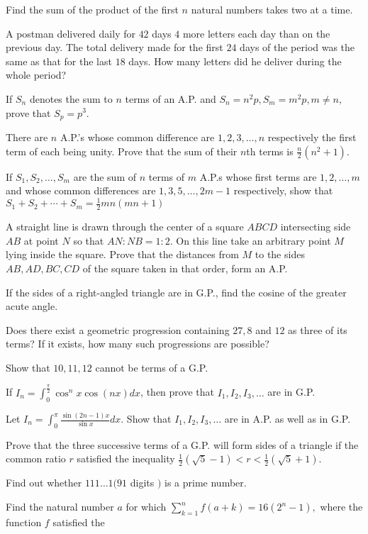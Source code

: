 \item Find the sum of the  product of the first $n$ natural numbers takes two at a time.
\item A postman delivered daily for $42$ days $4$ more letters each day than on the previous day. The total delivery made
  for the first $24$ days of the period was the same as that for the last $18$ days. How many letters did he deliver during the
  whole period?
\item If $S_n$ denotes the sum to $n$ terms of an A.P. and $S_n = n^2p, S_m = m^2p, m\neq n,$ prove that $S_p = p^3$.
\item There are $n$ A.P.'s whose common difference are $1, 2, 3, \ldots, n$ respectively the first term of each being
  unity. Prove that the sum of their $n$th terms is $\frac{n}{2}(n^2 + 1)$.
\item If $S_1, S_2, \ldots, S_m$ are the sum of $n$ terms of $m$ A.P.s whose first terms are $1, 2, \ldots, m$ and whose
  common differences are $1, 3, 5, \ldots, 2m - 1$ respectively, show that $S_1 + S_2 + \cdots + S_m = \frac{1}{2}mn(mn + 1)$
\item A straight line is drawn through the center of a square $ABCD$ intersecting side $AB$ at point $N$ so that $AN:NB =
  1:2.$ On this line take an arbitrary point $M$ lying inside the square. Prove that the distances from $M$ to the sides $AB, AD,
  BC, CD$ of the square taken in that order, form an A.P.
\item If the sides of a right-angled triangle are in G.P., find the cosine of the greater acute angle.
\item Does there exist a geometric progression containing $27, 8$ and $12$ as three of its terms? If it exists, how many
  such progressions are possible?
\item Show that $10, 11, 12$ cannot be terms of a G.P.
\item If $I_n = \displaystyle\int_0^{\frac{\pi}{2}}\cos^nx\cos(nx)dx$, then prove that $I_1, I_2, I_3, \ldots$ are in G.P.
\item Let $\displaystyle I_n = \int_0^\pi \frac{\sin(2n - 1)x}{\sin x}dx.$ Show that $I_1, I_2, I_3, \ldots$ are in A.P. as well as in
  G.P.
\item Prove that the three successive terms of a G.P. will form sides of a triangle if the common ratio $r$ satisfied the
  inequality $\frac{1}{2}(\sqrt{5} - 1) < r < \frac{1}{2}(\sqrt{5} + 1)$.
\item Find out whether $111\ldots1( 91$ digits $)$ is a prime number.
\item Find the natural number $a$ for which $\displaystyle\sum_{k = 1}^nf(a + k) = 16(2^n - 1),$ where the function $f$ satisfied the
